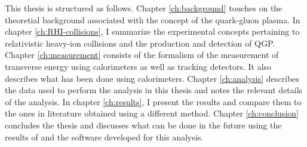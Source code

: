 This thesis is structured as follows. Chapter \ref{ch:background} touches on the theoretial background associated with the concept of the quark-gluon plasma. In chapter \ref{ch:RHI-collisions}, I summarize the experimental concepts pertaining to relativistic heavy-ion collisions and the production and detection of QGP. Chapter \ref{ch:measurement} consists of the formalism of the measurement of transverse energy using calorimeters as well as tracking detectors. It also describes what has been done using calorimeters. Chapter \ref{ch:analysis} describes the data used to perform the analysis in this thesis and notes the relevant details of the analysis. In chapter \ref{ch:results}, I present the results and compare them to the ones in literature obtained using a different method. Chapter \ref{ch:conclusion} concludes the thesis and discusses what can be done in the future using the results of and the software developed for this analysis.
